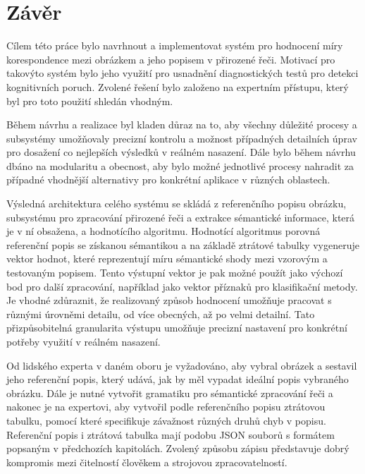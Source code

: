 \section{Závěr}
Cílem této práce bylo navrhnout a implementovat systém pro hodnocení míry korespondence mezi
obrázkem a jeho popisem v přirozené řeči.
Motivací pro takovýto systém bylo jeho využití pro usnadnění diagnostických testů pro detekci kognitivních poruch.
Zvolené řešení bylo založeno na expertním přístupu, který byl pro toto použití shledán vhodným.

Během návrhu a realizace byl kladen důraz na to, aby všechny důležité procesy a subsystémy umožňovaly
precizní kontrolu a možnost případných detailních úprav pro dosažení co nejlepších výsledků v reálném nasazení.
Dále bylo během návrhu dbáno na modularitu a obecnost, aby bylo možné jednotlivé procesy nahradit
za případné vhodnější alternativy pro konkrétní aplikace v různých oblastech.

Výsledná architektura celého systému se skládá z referenčního popisu obrázku, subsystému pro zpracování přirozené
řeči a extrakce sémantické informace, která je v ní obsažena, a hodnotícího algoritmu.
Hodnotící algoritmus porovná referenční popis se získanou sémantikou a na základě ztrátové tabulky vygeneruje
vektor hodnot, které reprezentují míru sémantické shody mezi vzorovým a testovaným popisem.
Tento výstupní vektor je pak možné použít jako výchozí bod pro další zpracování, například jako vektor příznaků pro klasifikační metody.
Je vhodné zdůraznit, že realizovaný způsob hodnocení umožňuje pracovat s různými úrovněmi detailu, od více obecných, až po velmi detailní.
Tato přizpůsobitelná granularita výstupu umožňuje precizní nastavení pro konkrétní potřeby využití v reálném nasazení.

Od lidského experta v daném oboru je vyžadováno, aby vybral obrázek a sestavil jeho referenční popis, který udává,
jak by měl vypadat ideální popis vybraného obrázku.
Dále je nutné vytvořit gramatiku pro sémantické zpracování řeči a nakonec je na expertovi, aby vytvořil podle referenčního popisu
ztrátovou tabulku, pomocí které specifikuje závažnost různých druhů chyb v popisu.
Referenční popis i ztrátová tabulka mají podobu JSON souborů s formátem popsaným v předchozích kapitolách.
Zvolený způsobu zápisu představuje dobrý kompromis mezi čitelností člověkem a strojovou zpracovatelností.


